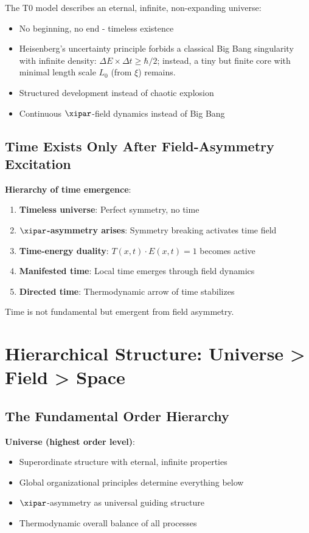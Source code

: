 	The T0 model describes an eternal, infinite, non-expanding universe:
	
	\begin{itemize}
		\item No beginning, no end - timeless existence
		\item Heisenberg's uncertainty principle forbids a classical Big Bang singularity with infinite density: $\Delta E \times \Delta t \geq \hbar/2$; instead, a tiny but finite core with minimal length scale $L_0$ (from $\xi$) remains.
		\item Structured development instead of chaotic explosion
		\item Continuous $\xipar$-field dynamics instead of Big Bang
	\end{itemize}
	
	\subsection{Time Exists Only After Field-Asymmetry Excitation}
	
	\textbf{Hierarchy of time emergence}:
	\begin{enumerate}
		\item \textbf{Timeless universe}: Perfect symmetry, no time
		\item \textbf{$\xipar$-asymmetry arises}: Symmetry breaking activates time field
		\item \textbf{Time-energy duality}: $T(x,t) \cdot E(x,t) = 1$ becomes active
		\item \textbf{Manifested time}: Local time emerges through field dynamics
		\item \textbf{Directed time}: Thermodynamic arrow of time stabilizes
	\end{enumerate}
	
	Time is not fundamental but emergent from field asymmetry.
	
	\section{Hierarchical Structure: Universe > Field > Space}
	
	\subsection{The Fundamental Order Hierarchy}
	
	\textbf{Universe (highest order level)}:
	\begin{itemize}
		\item Superordinate structure with eternal, infinite properties
		\item Global organizational principles determine everything below
		\item $\xipar$-asymmetry as universal guiding structure
		\item Thermodynamic overall balance of all processes
	\end{itemize}
	
